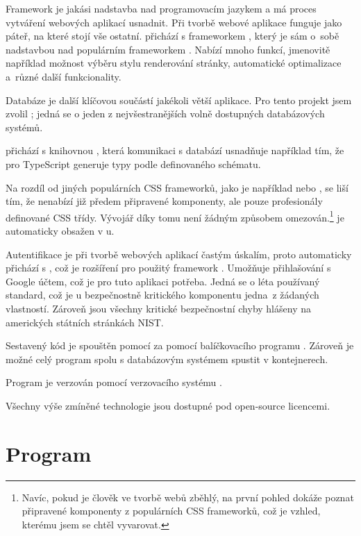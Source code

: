 Framework je jakási nadstavba nad programovacím jazykem a má proces vytváření webových aplikací usnadnit. Při tvorbě webové aplikace funguje jako páteř, na které stojí vše ostatní.  přichází s frameworkem , který je sám o~sobě nadstavbou nad populárním frameworkem . Nabízí mnoho funkcí, jmenovitě například možnost výběru stylu renderování stránky, automatické optimalizace a~různé další funkcionality.\cite{nextjs}

Databáze je další klíčovou součástí jakékoli větší aplikace. Pro tento projekt jsem zvolil ; jedná se o jeden z nejvšestranějších volně dostupných databázových systémů.

 přichází s knihovnou , která komunikaci s databází usnadňuje například tím, že pro TypeScript generuje typy podle definovaného schématu.

Na rozdíl od jiných populárních CSS frameworků, jako je například  nebo , se  liší tím, že nenabízí již předem připravené komponenty, ale pouze profesionály definované CSS třídy. Vývojář díky tomu není žádným způsobem omezován.\footnote{Navíc, pokud je člověk ve tvorbě webů zběhlý, na první pohled dokáže poznat připravené komponenty z populárních CSS  frameworků, což je vzhled, kterému jsem se chtěl vyvarovat.}\cite{tailwind}  je automaticky obsažen v u.

Autentifikace je při tvorbě webových aplikací častým úskalím, proto  automaticky přichází s , což je rozšíření pro použitý framework . Umožňuje přihlašování s Google účtem, což je pro tuto aplikaci potřeba. Jedná se o léta používaný standard, což je u bezpečnostně kritického komponentu jedna~z žádaných vlastností. Zároveň jsou všechny kritické bezpečnostní chyby hlášeny na amerických státních stránkách NIST.

Sestavený kód je spouštěn pomocí  za pomocí balíčkovacího programu . Zároveň je možné celý program spolu s databázovým systémem spustit v  kontejnerech.

Program je verzován pomocí verzovacího systému .

Všechny výše zmíněné technologie jsou dostupné pod open-source licencemi.

\section{Program}

